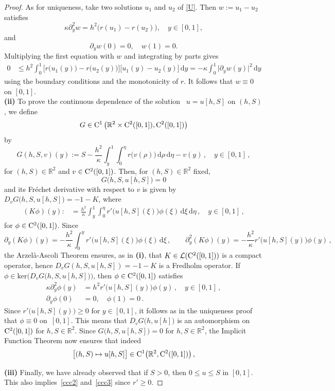 \documentclass[reqno,11pt]{amsart}
\numberwithin{equation}{section}
\newcommand{\R}{\mathbb{R}}
\newcommand{\rd}{\mathrm{d}}
\begin{document}
\begin{proof}
As for uniqueness, take two solutions $u_1$ and $u_2$ of
\eqref{U}. Then $w:=u_1-u_2$ satisfies
$$
\kappa\partial_{y}^2w= h^2\big(r(u_1)-r(u_2)\big), \quad y\in [0,1],
$$
and
$$
\partial_y w(0)=0,\quad w(1)=0. 
$$
Multiplying the first equation with $w$ and integrating by parts
gives
\begin{align*}
0&\le h^2 \int_0^1\Big[r\bigl(u_1(y)\bigr)-r\bigl(u_2(y)\bigr)\Big]\Big[u_1(y)-u_2(y)\Big]\,\rd y= -\kappa \int_0^1 \vert\partial_yw(y)\vert^2\,\rd y
\end{align*}
using the boundary conditions and the monotonicity of $r$. It follows
that $w\equiv 0$ on $[0,1]$.\\[.1cm]


{\bf (ii)} To prove the continuous dependence of the
solution ~$u=u[h,S]$ on $(h,S)$, we define
$$
G\in {\rm C}^1\left(\R^2\times {\rm C}^2([0,1]),{\rm C}^2([0,1])\right)
$$ 
by
\begin{equation*}
G(h,S,v)(y):=S-\frac{h^2}{\kappa}
  \int_y^1\int_0^\eta r \bigl( v(\rho)\bigr)\,\rd\rho \,\rd \eta-v(y)\,,\quad y\in [0,1]\,,
\end{equation*}
for $(h,S)\in\R^2$ and $v\in {\rm C}^2([0,1])$. Then, for $(h,S)\in\R^2$ fixed,
$$
G\bigl(h,S,u[h,S]\bigr)=0
$$ 
and its Fr\'echet derivative with respect to $v$ is given by $D_v
G\bigl(h,S,u[h,S]\bigr)=-1-K$, where
\begin{align*}
(K\phi) (y):&=\frac{h^2}{\kappa}
  \int_y^1\int_0^\eta r' \bigl( u[h,S](\xi)\bigr) \phi(\xi)\,\rd\xi \,\rd \eta\,,\quad y\in [0,1]\,,
\end{align*}
for $\phi\in
{\rm C}^2([0,1])$. Since
$$
\partial_y (K\phi) (y)=-\frac{h^2}{\kappa} \int_0^y  r'\bigl(
u[h,S](\xi)\bigr)\phi(\xi)\,\rd \xi\,,\qquad 
\partial_y^2 (K\phi) (y)=-\frac{h^2}{\kappa}  r'\bigl(
u[h,S](y)\bigr)\phi(y)\,,
$$
the Arzel\`a-Ascoli Theorem ensures, as in {\bf (i)}, that $K\in
\mathcal{L}({\rm C}^2([0,1]))$ is a compact operator, hence
$D_v G(h,S,u[h,S]) =-1- K$ is a Fredholm operator. If $\phi\in \mathrm{ker}
\bigl(D_v G\bigl(h,S,u[h,S]\bigr)\bigr)$, then $\phi\in
{\rm C}^2([0,1])$ satisfies
\begin{align*}
\kappa\partial_y^2\phi(y)&= h^2r'\bigl(u[h,S](y)\bigr)\phi(y)\,, \quad y\in [0,1]\,,\\
\partial_y\phi(0)&=0,\quad \phi(1)=0\,.
\end{align*}
Since $r'\bigl(u[h,S](y)\bigr )\ge 0$ for $y\in [0,1]$, it follows as
in the uniqueness proof that $\phi\equiv 0$ on~$[0,1]$. This means
that $D_v G\bigl( h,u[h]\bigr)$ is an automorphism on
${\rm C}^2([0,1])$ for $h,S\in\R^2$. Since $G\bigl(
h,S,u[h,S]\bigr)=0$ for $h,S\in\R^2$, the Implicit Function Theorem now
ensures that indeed
$$
\big[ (h,S)\mapsto u[h,S] \big]\in {\rm C}^1\bigl(\R^2,
{\rm C}^2([0,1])\big)\,,
$$


{\bf (iii)}  Finally, we have already observed that if $S>0$, then $0\le u\le S$ in $[0,1]$. This also implies~\eqref{ccc2} and~\eqref{ccc3}  since $r'\ge 0$.  
\end{proof}
\end{document}
